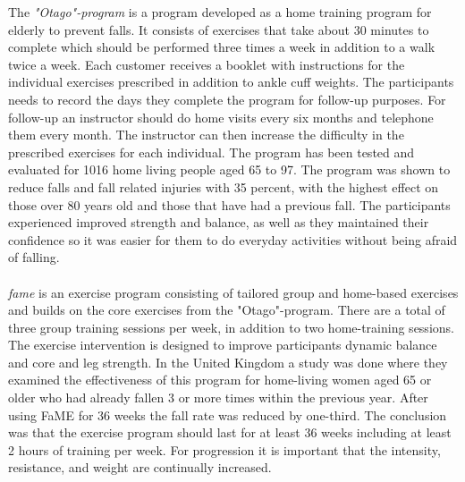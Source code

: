 The \emph{"Otago"-program} is a program developed as a home training program for elderly to prevent falls. It consists of exercises that take about 30 minutes to complete which should be performed three times a week in addition to a walk twice a week. Each customer receives a booklet with instructions for the individual exercises prescribed in addition to ankle cuff weights. The participants needs to record the days they complete the program for follow-up purposes. For follow-up an instructor should do home visits every six months and telephone them every month. The instructor can then increase the difficulty in the prescribed exercises for each individual. The program has been tested and evaluated for 1016 home living people aged 65 to 97. The program was shown to reduce falls and fall related injuries with 35 percent, with the highest effect on those over 80 years old and those that have had a previous fall. The participants experienced improved strength and balance, as well as they maintained their confidence so it was easier for them to do everyday activities without being afraid of falling. \cite{otago} \cite{gruppetrening-trheim}\\ \\
\emph{\ac{fame}} is an exercise program consisting of tailored group and home-based exercises and builds on the core exercises from the "Otago"-program.  There are a total of three group training sessions per week, in addition to two home-training sessions. The exercise intervention is designed to improve participants dynamic balance and core and leg strength.  In the United Kingdom a study was done where they examined the effectiveness of this program for home-living women aged 65 or older who had already fallen 3 or more times within the previous year. After using FaME for 36 weeks the fall rate was reduced by one-third. The conclusion was that the exercise program should last for at least 36 weeks including at least 2 hours of training per week. For progression it is important that the intensity, resistance, and weight are continually increased.\cite{fame}\\ \\
